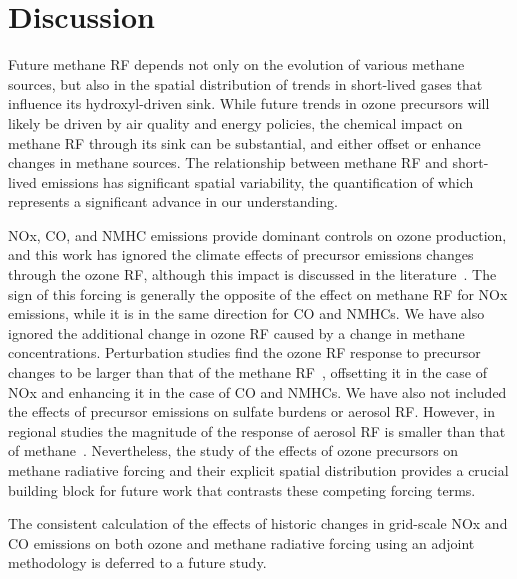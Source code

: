 \section{Discussion}

Future methane RF depends not only on the evolution of various methane sources, but also in the spatial distribution of trends in short-lived gases that influence its hydroxyl-driven sink. While future trends in ozone precursors will likely be driven by air quality and energy policies, the chemical impact on methane RF through its sink can be substantial, and either offset or enhance changes in methane sources. The relationship between methane RF and short-lived emissions has significant spatial variability, the quantification of which represents a significant advance in our understanding.

NOx, CO, and NMHC emissions provide dominant controls on ozone production, and this work has ignored the climate effects of precursor emissions changes through the ozone RF, although this impact is discussed in the literature~\citep{ref:naik2005,ref:bowman2012,ref:shindell2013}. The sign of this forcing is generally the opposite of the effect on methane RF for NOx emissions, while it is in the same direction for CO and NMHCs. We have also ignored the additional change in ozone RF caused by a change in methane concentrations. Perturbation studies find the ozone RF response to precursor changes to be larger than that of the methane RF~\citep{ref:akimoto2015}, offsetting it in the case of NOx and enhancing it in the case of CO and NMHCs. We have also not included the effects of precursor emissions on sulfate burdens or aerosol RF. However, in regional studies the magnitude of the response of aerosol RF is smaller than that of methane~\citep{ref:fry2012}. Nevertheless, the study of the effects of ozone precursors on methane radiative forcing and their explicit spatial distribution provides a crucial building block for future work that contrasts these competing forcing terms.

The consistent calculation of the effects of historic changes in grid-scale NOx and CO emissions on both ozone and methane radiative forcing using an adjoint methodology is deferred to a future study.



